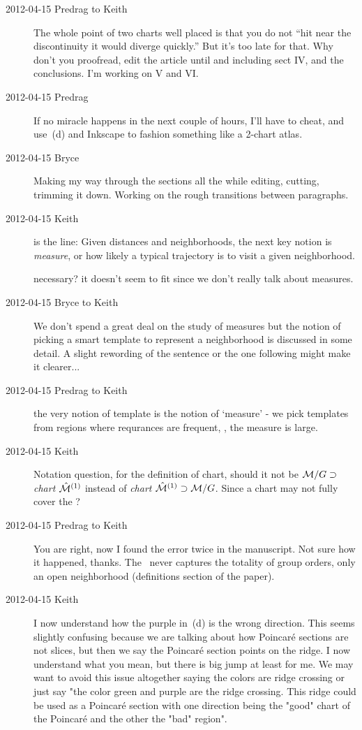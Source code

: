 \begin{description}
\item[2012-04-15 Predrag to Keith] The whole point of two charts well
placed is that you do not ``hit near the discontinuity it would diverge
quickly.'' But it's too late for that. Why don't you proofread, edit the
article until and including sect IV, and the conclusions. I'm working on
V and VI.

\item[2012-04-15 Predrag] If no miracle happens in the next couple of
hours, I'll have to cheat, and use \,(d) and
Inkscape to fashion something like a 2-chart atlas.

\item[2012-04-15 Bryce] Making my way through the sections all the while
editing, cutting, trimming it down. Working on the rough transitions
between paragraphs.

\item[2012-04-15 Keith] is the line:
Given distances and neighborhoods,
the next key notion is  \emph{measure}, or how likely a typical
trajectory is to visit a given neighborhood.

necessary? it doesn't seem to fit since we don't really talk about measures.

\item[2012-04-15 Bryce to Keith] We don't spend a great deal on the study
of measures but the notion of picking a smart template to represent a
neighborhood is discussed in some detail. A slight rewording of the
sentence or the one following might make it clearer...

\item[2012-04-15 Predrag to Keith] the very notion of template is the
notion of `measure' - we pick templates from regions where requrances are
frequent, \ie, the measure is large.

\item[2012-04-15 Keith]  Notation question, for the definition of chart,
should it not be ${\cal M}/G \supset$ \emph{chart} $\hat{\cal M}{}^{(1)}$
instead of \emph{chart} $\hat{\cal M}{}^{(1)} \supset {\cal M}/G$.  Since a
chart may not fully cover the {\reducedsp}?

\item[2012-04-15 Predrag to Keith] You are right, now I found the error twice
in the manuscript. Not sure how it happened, thanks. The \slice\ never
captures the totality of group orders, only an open neighborhood
(definitions section of the paper).

\item[2012-04-15 Keith] I now understand how the purple in
\,(d) is the wrong direction.  This seems slightly
confusing because we are talking about how Poincar\'e sections are not
slices, but then we say the Poincar\'e section points on the ridge.  I
now understand what you mean, but there is big jump at least for me.  We
may want to avoid this issue altogether saying the colors are ridge
crossing or just say "the color green and purple are the ridge crossing.
This ridge could be used as a Poincar\'e section with one direction being
the "good" chart of the Poincar\'e and the other the "bad" region".


\end{description}
